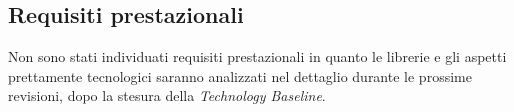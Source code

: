 \subsection{Requisiti prestazionali}
Non sono stati individuati requisiti prestazionali in quanto le librerie e gli aspetti prettamente tecnologici saranno analizzati nel dettaglio durante le prossime revisioni, dopo la stesura della \emph{Technology Baseline}.